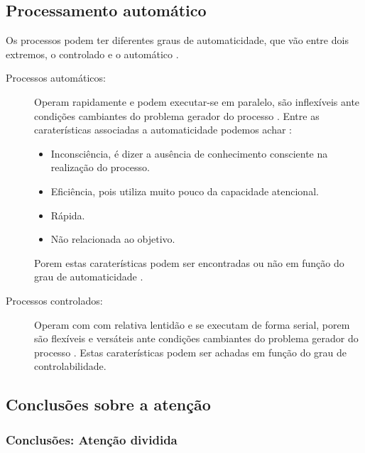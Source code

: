 \subsection{Processamento automático}
Os processos podem ter diferentes graus de automaticidade,
que vão entre dois extremos, o controlado e o automático \cite[pp. 201]{eysenck2017manual}.
\begin{description}
\item[Processos automáticos:] Operam rapidamente e podem executar-se em paralelo, 
são inflexíveis ante condições cambiantes do problema gerador do processo
 \cite[pp. 198]{eysenck2017manual}.
Entre as caraterísticas associadas a automaticidade podemos achar \cite[pp. 198]{eysenck2017manual}:
\begin{itemize}
\item Inconsciência, é dizer a ausência de conhecimento consciente na realização do processo.
\item Eficiência, pois utiliza muito pouco da capacidade atencional.
\item Rápida.
\item Não relacionada ao objetivo.
\end{itemize}
Porem estas caraterísticas podem ser encontradas ou não 
em função do grau de automaticidade  \cite[pp. 198]{eysenck2017manual}.
\item[Processos controlados:] Operam com com relativa lentidão e se executam de forma serial, 
porem são flexíveis e versáteis ante condições cambiantes do problema gerador do processo
 \cite[pp. 198]{eysenck2017manual}.
Estas caraterísticas podem ser achadas em função do grau de controlabilidade.
\end{description}

\subsection{Conclusões sobre a atenção}
\label{subsec:atencaodividida}

\subsubsection{Conclusões: Atenção  dividida }

